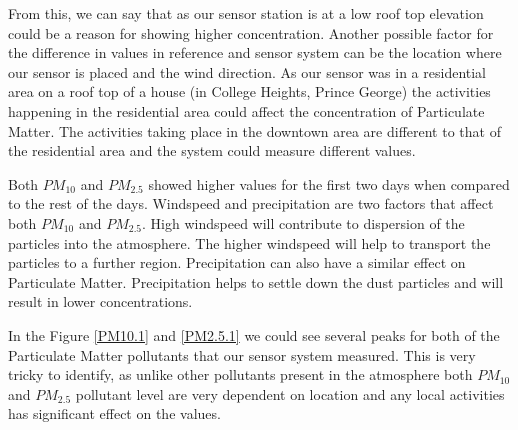 \clearpage







From this, we can say that as our sensor station is at a low roof top elevation could be a reason for showing higher concentration. Another possible factor for the difference in values in reference and sensor system can be the location where our sensor is placed and the wind direction. As our sensor was in a residential area on a roof top of a house (in College Heights, Prince George) the activities happening in the residential area could affect the concentration of Particulate Matter. The activities taking place in the downtown area are different to that of the residential area and the system could measure different values.


Both $PM_{10}$ and $PM_{2.5}$ showed higher values for the first two days when compared to the rest of the days. Windspeed and precipitation are two factors that affect both $PM_{10}$ and $PM_{2.5}$. High windspeed will contribute to dispersion of the particles into the atmosphere. The higher windspeed will help to transport the particles to a further region. Precipitation can also have a similar effect on Particulate Matter. Precipitation helps to settle down the dust particles and will result in lower concentrations.



In the Figure \ref{PM10.1} and \ref{PM2.5.1} we could see several peaks for both of the Particulate Matter pollutants that our sensor system measured. This is very tricky to identify, as unlike other pollutants present in the atmosphere both $PM_{10}$  and $PM_{2.5}$ pollutant level are very dependent on location and any local activities has significant effect on the values.









